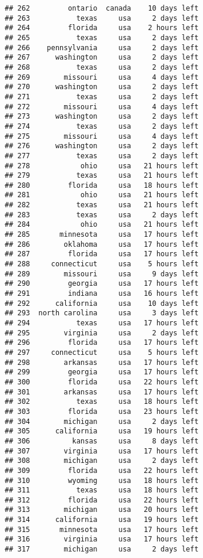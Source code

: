 \documentclass[
]{article}
\begin{document}
\begin{verbatim}
## 262         ontario  canada    10 days left
## 263           texas     usa     2 days left
## 264         florida     usa    2 hours left
## 265           texas     usa     2 days left
## 266    pennsylvania     usa     2 days left
## 267      washington     usa     2 days left
## 268           texas     usa     2 days left
## 269        missouri     usa     4 days left
## 270      washington     usa     2 days left
## 271           texas     usa     2 days left
## 272        missouri     usa     4 days left
## 273      washington     usa     2 days left
## 274           texas     usa     2 days left
## 275        missouri     usa     4 days left
## 276      washington     usa     2 days left
## 277           texas     usa     2 days left
## 278            ohio     usa   21 hours left
## 279           texas     usa   21 hours left
## 280         florida     usa   18 hours left
## 281            ohio     usa   21 hours left
## 282           texas     usa   21 hours left
## 283           texas     usa     2 days left
## 284            ohio     usa   21 hours left
## 285       minnesota     usa   17 hours left
## 286        oklahoma     usa   17 hours left
## 287         florida     usa   17 hours left
## 288     connecticut     usa    5 hours left
## 289        missouri     usa     9 days left
## 290         georgia     usa   17 hours left
## 291         indiana     usa   16 hours left
## 292      california     usa    10 days left
## 293  north carolina     usa     3 days left
## 294           texas     usa   17 hours left
## 295        virginia     usa     2 days left
## 296         florida     usa   17 hours left
## 297     connecticut     usa    5 hours left
## 298        arkansas     usa   17 hours left
## 299         georgia     usa   17 hours left
## 300         florida     usa   22 hours left
## 301        arkansas     usa   17 hours left
## 302           texas     usa   18 hours left
## 303         florida     usa   23 hours left
## 304        michigan     usa     2 days left
## 305      california     usa   19 hours left
## 306          kansas     usa     8 days left
## 307        virginia     usa   17 hours left
## 308        michigan     usa     2 days left
## 309         florida     usa   22 hours left
## 310         wyoming     usa   18 hours left
## 311           texas     usa   18 hours left
## 312         florida     usa   22 hours left
## 313        michigan     usa   20 hours left
## 314      california     usa   19 hours left
## 315       minnesota     usa   17 hours left
## 316        virginia     usa   17 hours left
## 317        michigan     usa     2 days left

\end{verbatim}
\end{document}
